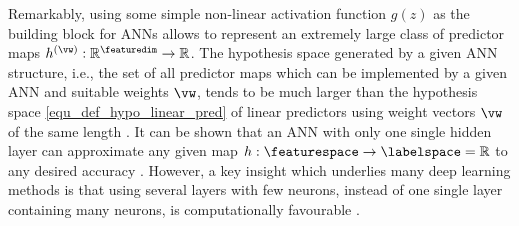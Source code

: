 \documentclass[12pt]{report}
\begin{document}
Remarkably, using some simple non-linear activation function $g(z)$ as the building 
block for ANNs allows to represent an extremely large class of predictor maps 
$h^{(\vw)}: \mathbb{R}^{\featuredim} \rightarrow \mathbb{R}$. The hypothesis 
space generated by a given ANN structure, i.e., the set of all predictor maps which 
can be implemented by a given ANN and suitable weights $\vw$, tends to be 
much larger than the hypothesis space \eqref{equ_def_hypo_linear_pred} of 
linear predictors using weight vectors $\vw$ of the same length \cite[Ch. 6.4.1.]{Goodfellow-et-al-2016}. 
It can be shown that an ANN with only one single hidden layer can approximate any given map $h: \featurespace \rightarrow \labelspace=\mathbb{R}$ 
to any desired accuracy \cite{Cybenko1989}. However, a key insight which underlies many 
deep learning methods is that using several layers with few neurons, instead of one 
single layer containing many neurons, is computationally favourable \cite{DBLP:journals/corr/EldanS15}. 
\end{document}
